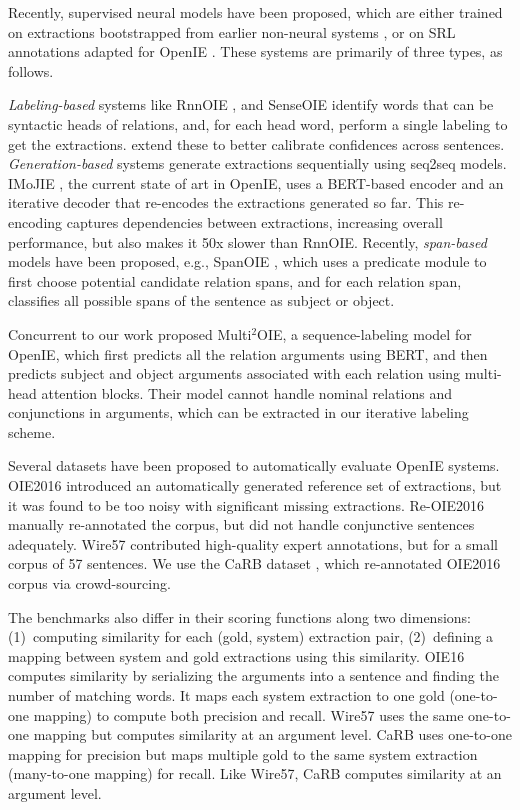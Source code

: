 \documentclass[11pt,a4paper]{article}
\begin{document}
Recently, supervised neural models have been proposed, which are either trained on extractions bootstrapped from earlier non-neural systems \cite{cui+18}, or on SRL annotations adapted for OpenIE \cite{Stanovsky2016EMNLP}. These systems are primarily of three types, as follows.

\textit{Labeling-based} systems like RnnOIE \cite{stanovsky&al18}, and SenseOIE \cite{roy&al19} identify words that can be syntactic heads of relations, and, for each head word, perform a single labeling to get the extractions.
\citet{jiang&al19} extend these to better calibrate confidences across sentences.
\textit{Generation-based} systems \cite{cui+18,sun2018logician} generate extractions sequentially using seq2seq models. IMoJIE \cite{kolluru&al20}, the current state of art in OpenIE, uses a BERT-based encoder and an iterative decoder that re-encodes the extractions generated so far. This re-encoding captures dependencies between extractions, increasing overall performance, but also makes it 50x slower than RnnOIE.
Recently, \textit{span-based} models \cite{jiang&al19} have been proposed, e.g., SpanOIE \cite{zhan&al19}, which uses a predicate module to first choose potential candidate relation spans, and for each relation span, classifies all possible spans of the sentence as subject or object.

Concurrent to our work \cite{ro&al20} proposed Multi$^2$OIE, a sequence-labeling model for OpenIE, which first predicts all the relation arguments using BERT, and then predicts subject and object arguments associated with each relation using multi-head attention blocks. Their model cannot handle nominal relations and conjunctions in arguments, which can be extracted in our iterative labeling scheme.




\vspace*{0.5ex}
 Several datasets have been proposed to automatically evaluate OpenIE systems.
OIE2016 \cite{Stanovsky2016EMNLP} introduced an automatically generated reference set of extractions, but it was found to be too noisy with significant missing extractions. Re-OIE2016 \cite{zhan&al19} manually re-annotated the corpus, but did not handle conjunctive sentences adequately. Wire57 \cite{william&al18} contributed high-quality expert annotations, but for a small corpus of 57 sentences. We use the CaRB dataset \cite{bhardwaj&al19}, which re-annotated OIE2016 corpus via crowd-sourcing. 

The benchmarks also differ in their scoring functions along two dimensions: (1)~computing similarity for each (gold, system) extraction pair, (2)~defining a mapping between system and gold extractions using this similarity. OIE16 computes similarity by serializing the arguments into a sentence and finding the number of matching words. It maps each system extraction to one gold (one-to-one mapping) to compute both precision and recall. Wire57 uses the same one-to-one mapping but computes similarity at an argument level. CaRB uses one-to-one mapping for precision but maps multiple gold to the same system extraction (many-to-one mapping) for recall. Like Wire57, CaRB computes similarity at an argument level.
\end{document}
